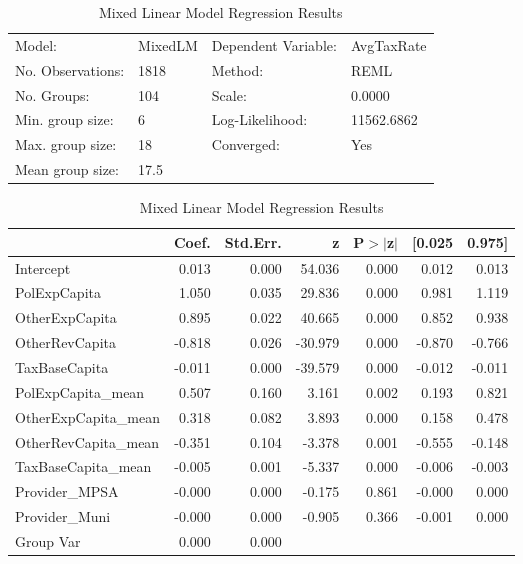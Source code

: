 \begin{table}
\caption{Mixed Linear Model Regression Results}
\label{}
\begin{center}
\begin{tabular}{llll}
\hline
Model:            & MixedLM & Dependent Variable: & AvgTaxRate  \\
No. Observations: & 1818    & Method:             & REML        \\
No. Groups:       & 104     & Scale:              & 0.0000      \\
Min. group size:  & 6       & Log-Likelihood:     & 11562.6862  \\
Max. group size:  & 18      & Converged:          & Yes         \\
Mean group size:  & 17.5    &                     &             \\
\hline
\end{tabular}
\end{center}

\begin{center}
\begin{tabular}{lrrrrrr}
\hline
                     &  Coef. & Std.Err. &       z & P$> |$z$|$ & [0.025 & 0.975]  \\
\hline
Intercept            &  0.013 &    0.000 &  54.036 &       0.000 &  0.012 &  0.013  \\
PolExpCapita         &  1.050 &    0.035 &  29.836 &       0.000 &  0.981 &  1.119  \\
OtherExpCapita       &  0.895 &    0.022 &  40.665 &       0.000 &  0.852 &  0.938  \\
OtherRevCapita       & -0.818 &    0.026 & -30.979 &       0.000 & -0.870 & -0.766  \\
TaxBaseCapita        & -0.011 &    0.000 & -39.579 &       0.000 & -0.012 & -0.011  \\
PolExpCapita\_mean   &  0.507 &    0.160 &   3.161 &       0.002 &  0.193 &  0.821  \\
OtherExpCapita\_mean &  0.318 &    0.082 &   3.893 &       0.000 &  0.158 &  0.478  \\
OtherRevCapita\_mean & -0.351 &    0.104 &  -3.378 &       0.001 & -0.555 & -0.148  \\
TaxBaseCapita\_mean  & -0.005 &    0.001 &  -5.337 &       0.000 & -0.006 & -0.003  \\
Provider\_MPSA       & -0.000 &    0.000 &  -0.175 &       0.861 & -0.000 &  0.000  \\
Provider\_Muni       & -0.000 &    0.000 &  -0.905 &       0.366 & -0.001 &  0.000  \\
Group Var            &  0.000 &    0.000 &         &             &        &         \\
\hline
\end{tabular}
\end{center}
\end{table}
\bigskip
